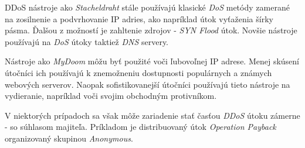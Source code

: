 \documentclass[
  digital, %
  table,   %
  lof,     %
  nolot,   %
  nocover
]{fithesis3}
\begin{document}
DDoS nástroje ako \textit{Stacheldraht} stále používajú klasické \textit{DoS} metódy zamerané na
zosilnenie a podvrhovanie IP adries, ako napríklad útok vyťaženia šírky pásma. Ďalšou z možností je
zahltenie zdrojov - \textit{SYN Flood} útok. Novšie nástroje používajú na \textit{DoS} útoky taktiež
\textit{DNS} servery.

Nástroje ako \textit{MyDoom} môžu byť použité voči ľubovoľnej IP adrese. Menej skúsení útočníci ich
používajú k znemožneniu dostupnosti populárnych a známych webových serverov. Naopak sofistikovanejší
útočníci používajú tieto nástroje na vydieranie, napríklad voči svojim obchodným protivníkom.

V niektorých prípadoch sa však môže zariadenie stať časťou \textit{DDoS} útoku zámerne - so súhlasom
majiteľa. Príkladom je distribuovaný útok \textit{Operation Payback} organizovaný skupinou
\textit{Anonymous}.






\end{document}
